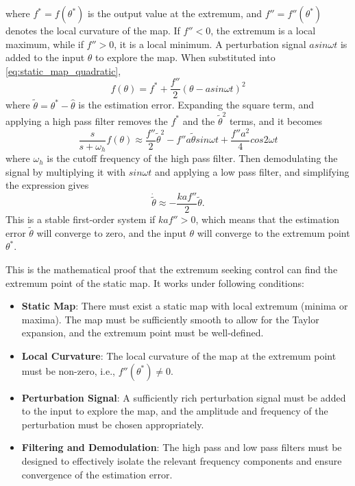 ﻿\documentclass[subscriptcorrection,upint,varvw,barcolor=Goldenrod3,mathalfa=cal=euler,balance,hyphenate,french,pdf-a]{asmejour}
\begin{document}
where $f^\ast=f(\theta^\ast)$ is the output value at the extremum, and $f''=f''(\theta^\ast)$ denotes the local curvature of the map. If $f''<0$, the extremum is a local maximum, while if $f''>0$, it is a local minimum.
A perturbation signal $a sin \omega t$ is added to the input $\theta$ to explore the map. When substituted into \ref{eq:static_map_quadratic}, 
\begin{equation}
f(\theta)
=
f^\ast
+
\frac{f''}{2}\left(\theta - a sin \omega t\right)^2
\end{equation}
where $\tilde{\theta} = \theta^\ast - \hat{\theta}$ is the estimation error. Expanding the square term, and applying a high pass filter removes the $f^\ast$ and the $\tilde{\theta}^2$ terms, and it becomes
\begin{equation}
\frac{s}{s+\omega_h}f(\theta)
\approx
\frac{f''}{2}\tilde{\theta}^2
-
f''a\tilde{\theta}sin \omega t
+
\frac{f''a^2}{4}cos 2\omega t
\end{equation}
where $\omega_h$ is the cutoff frequency of the high pass filter. Then demodulating the signal by multiplying it with $sin \omega t$ and applying a low pass filter, and simplifying the expression gives
\begin{equation}
    \dot{\tilde{\theta}} \approx 
    - \frac{kaf''}{2}\tilde{\theta}.
\end{equation}
This is a stable first-order system if $kaf''>0$, which means that the estimation error $\tilde{\theta}$ will converge to zero, and the input $\theta$ will converge to the extremum point $\theta^\ast$.

This is the mathematical proof that the extremum seeking control can find the extremum point of the static map. It works under following conditions:
\begin{itemize}
    \item \textbf{Static Map}: There must exist a static map with local extremum (minima or maxima). The map must be sufficiently smooth to allow for the Taylor expansion, and the extremum point must be well-defined.
    \item \textbf{Local Curvature}: The local curvature of the map at the extremum point must be non-zero, i.e., $f''(\theta^\ast) \neq 0$.
    \item \textbf{Perturbation Signal}: A sufficiently rich perturbation signal must be added to the input to explore the map, and the amplitude and frequency of the perturbation must be chosen appropriately.
    \item \textbf{Filtering and Demodulation}: The high pass and low pass filters must be designed to effectively isolate the relevant frequency components and ensure convergence of the estimation error.
\end{itemize}
\end{document}
